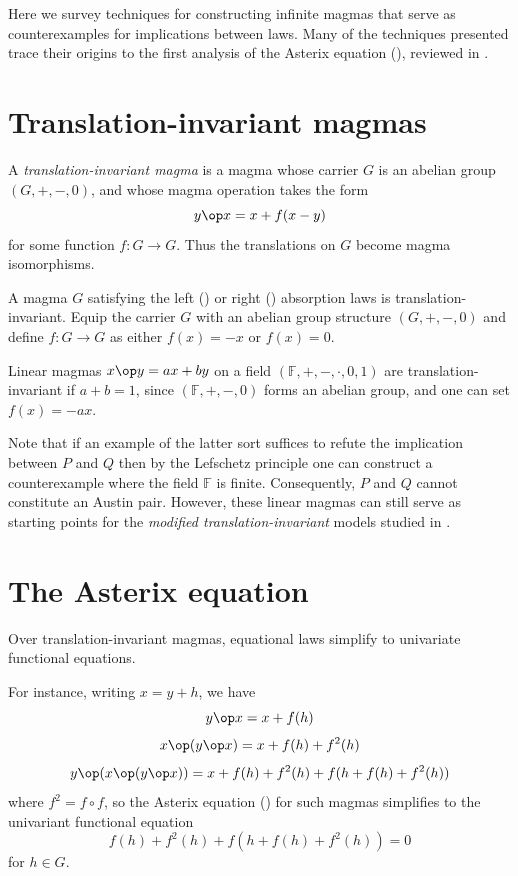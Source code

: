 Here we survey techniques for constructing infinite magmas that serve as counterexamples for implications
between laws. Many of the techniques presented trace their origins to the first analysis of the Asterix equation
(), reviewed in .

\section{Translation-invariant magmas}

A \emph{translation-invariant magma} is a magma whose carrier $G$ is an abelian group $(G,+,-,0)$, and whose magma operation takes the form
$$ y \op x = x + f(x-y)$$
for some function $f: G \to G$.  Thus the translations on $G$ become magma isomorphisms.

\begin{example}
  A magma $G$ satisfying the left () or right () absorption laws is translation-invariant.
  Equip the carrier $G$ with an abelian group structure $(G,+,-,0)$ and define $f: G \to G$ as either $f(x) = -x$ or $f(x) = 0$.
\end{example}

\begin{example}
  Linear magmas $x\op y = ax+by$ on a field $(\mathbb{F},+,-,\cdot,0,1)$ are translation-invariant if $a + b = 1$,
  since $(\mathbb{F},+,-,0)$ forms an abelian group, and one can set $f(x) = -ax$.
\end{example}

Note that if an example of the latter sort suffices to refute the implication between $P$ and $Q$ then
by the Lefschetz principle one can construct a counterexample where the field $\mathbb{F}$ is finite.
Consequently, $P$ and $Q$ cannot constitute an Austin pair. However, these linear magmas can still serve
as starting points for the \emph{modified translation-invariant} models studied in .

\section{The Asterix equation}\label{asterix-section}

Over translation-invariant magmas, equational laws simplify to univariate functional equations.

For instance, writing $x = y+h$, we have
$$ y \op x = x + f(h)$$
$$ x \op (y \op x) = x + f(h) + f^2(h)$$
$$ y \op (x \op (y \op x)) = x + f(h) + f^2(h) + f( h + f(h) + f^2(h) )$$
where $f^2 = f \circ f$, so the Asterix equation () for such magmas simplifies to the univariant functional equation
\begin{equation}\label{fh}
   f(h) + f^2(h) + f( h + f(h) + f^2(h) ) = 0
\end{equation}
for $h \in G$.

